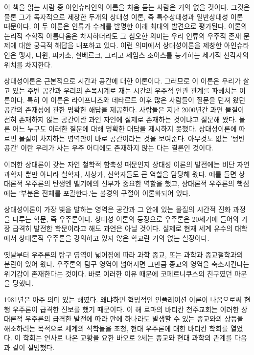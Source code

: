 이 책을 읽는 사람 중 아인슈타인의 이름을 처음 듣는 사람은 거의 없을 것이다. 그것은
물론 그가
독자적으로 제창한 두개의 상대성 이론, 즉 특수상대성과 일반상대성 이론 때문이다. 이 두
이론은 인류가 수레를 발명한 이래 최대의 발견으로 평가된다. 이론의 논리적 수학적 아름다움은
차지하더라도 그 심오한 의미는 우리 인류의 우주적 존재 문제에 대한 궁극적 해답을 내포하고
있다. 이런 의미에서 상대성이론을 제창한 아인슈타인은 맹자, 다윈, 피카소, 쇤베르크, 그리고
제임스 조이스를 능가하는 세기적 선각자의 위치를 차지한다.

상대성이론은 근본적으로 시간과
공간에 대한 이론이다. 그러므로 이 이론은 우리가 살고 있는 주변 공간과 우리의 손목시계로
재는 시간의 우주적 연관 관계를 파헤치는 이론이다. 특히 이 이론은 라이프니츠와 데타르트
이후 많은 사람들이 질문을 던져 왔던 공간의 존재성에 관한 명확한 해답을 제공한다.
사람들은 지난 2000년간 과연 물질이 전혀 존재하지 않는 공간이란 과연 자연에 실제로
존재하는 것이냐고 질문해 왔다. 물론 어느 누구도 이러한 질문에 대해 명확한 대답을
제시하지 못했다. 상대성이론에 따르면 물질이 차지하는 영역만이 바로 공간이라는 것을
보여준다. 아무것도 없는 '텅빈 공간' 이란 우리가 사는 우주 어디에도 존재하지 않는 다는
결론인 것이다.

이러한 상대론이 갖는 자연 철학적 함축성 때문인지 상대성 이론의 발전에는 비단 자연 과학자
뿐만 아니라 철학자, 사상가, 신학자들도 큰 역할을 담당해 왔다. 예를 들면 상대론적 우주론의
탄생엔 벨기에의 신부가 중요한 역할을 했고, 상대론적 우주론의 핵심에는 '부분은 전체를
포괄한다.'는 불경의 구절이 이론화되어 있다.

상대성이론이 가장 빛을 발하는 영역은 공간과 그 안에 있는 물질의 시간적 진화 과정을
다루는 학문, 즉 우주론이다. 상대성 이론의 등장으로 우주론은 20세기에 들어와 가장 급격히
발전한 학문이라고 해도 과언은 아닐 것이다. 실제로 현재 세계 유수의 대학에서 상대론적
우주론을 강의하고 있지 않은 학교란 거의 없는 실정이다.

옛날부터 우주론의 탐구 영역이
넓어짐에 따라 과학 종교, 또는 과학과 종교철학과의 분란이 있어 왔다. 우주론의 탐구 영역이
넓어지면 그만큼 종교의 영역을 축소시킨다는 위기감이 존재한다는 것이다. 바로 이러한 이유
때문에 코페르니쿠스의 친구였던 파문을 당했다.

1981년은 아주 의미 있는 해였다. 왜냐하면
혁명적인 인플레이션 이론이 나옴으로써 현행 우주론이 급격한 진보를 했기 때문이다. 이 해
로마의 바티칸 천주교회는 이러한 상대론적 우주론의 급격한 발전에 따라 만에 하나라도 발생할
수 있는 종교와의 상등을 해소하려는 목적으로 세계의 석학들을 초청, 현대  우주론에 대한
바티칸 학회를 열었다.
이 학회는 연사로 나온 교황을 요한 바오로 2세는 종교와 현대 과학의 관계를 다음과 같이
설명했다.

